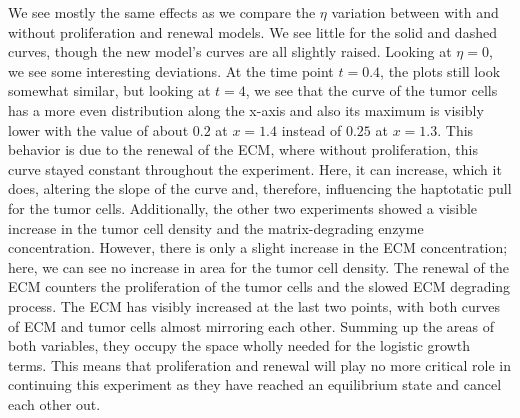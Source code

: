 We see mostly the same effects as we compare the $\eta$ variation between with and without proliferation and renewal models. We see little for the solid and dashed curves, though the new model's curves are all slightly raised. Looking at $\eta=0$, we see some interesting deviations. At the time point $t=0.4$, the plots still look somewhat similar, but looking at $t=4$, we see that the curve of the tumor cells has a more even distribution along the x-axis and also its maximum is visibly lower with the value of about $0.2$ at $x=1.4$ instead of $0.25$ at $x=1.3$. This behavior is due to the renewal of the ECM, where without proliferation, this curve stayed constant throughout the experiment. Here, it can increase, which it does, altering the slope of the curve and, therefore, influencing the haptotatic pull for the tumor cells.
Additionally, the other two experiments showed a visible increase in the tumor cell density and the matrix-degrading enzyme concentration. However, there is only a slight increase in the ECM concentration; here, we can see no increase in area for the tumor cell density. The renewal of the ECM counters the proliferation of the tumor cells and the slowed ECM degrading process. The ECM has visibly increased at the last two points, with both curves of ECM and tumor cells almost mirroring each other. Summing up the areas of both variables, they occupy the space wholly needed for the logistic growth terms. This means that proliferation and renewal will play no more critical role in continuing this experiment as they have reached an equilibrium state and cancel each other out. 


